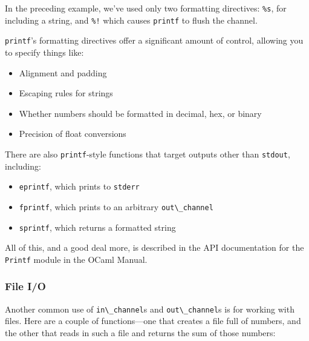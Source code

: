 In the preceding example, we've used only two formatting directives:
\passthrough{\lstinline!\%s!}, for including a string, and
\passthrough{\lstinline"\%!"} which causes
\passthrough{\lstinline!printf!} to flush the channel.

\passthrough{\lstinline!printf!}'s formatting directives offer a
significant amount of control, allowing you to specify things like:

\begin{itemize}
\item
  Alignment and padding
\item
  Escaping rules for strings
\item
  Whether numbers should be formatted in decimal, hex, or binary
\item
  Precision of float conversions
\end{itemize}

There are also \passthrough{\lstinline!printf!}-style functions that
target outputs other than \passthrough{\lstinline!stdout!}, including:

\begin{itemize}
\item
  \passthrough{\lstinline!eprintf!}, which prints to
  \passthrough{\lstinline!stderr!}
\item
  \passthrough{\lstinline!fprintf!}, which prints to an arbitrary
  \passthrough{\lstinline!out\_channel!}
\item
  \passthrough{\lstinline!sprintf!}, which returns a formatted string
\end{itemize}

All of this, and a good deal more, is described in the API documentation
for the \passthrough{\lstinline!Printf!} module in the OCaml Manual.

\hypertarget{file-io}{%
\subsubsection{File I/O}\label{file-io}}

Another common use of \passthrough{\lstinline!in\_channel!}s and
\passthrough{\lstinline!out\_channel!}s is for working with files. Here
are a couple of functions---one that creates a file full of numbers, and
the other that reads in such a file and returns the sum of those
numbers:

